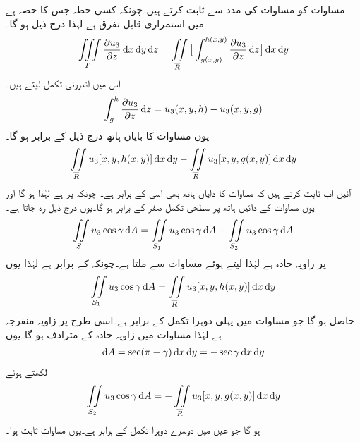 مساوات  کو مساوات  کی مدد سے ثابت کرتے ہیں۔چونکہ کسی خطہ جس کا  حصہ ہے میں  استمراری قابل تفرق ہے لہٰذا درج ذیل ہو گا۔
\begin{align}\label{مساوات_خطی_تکمل_مسئلہ_گاوس_ح}
\iiint\limits_T \frac{\partial u_3}{\partial z} \dif x\dif y\dif z=\iint\limits_{\overline{R}}\big[\int_{g(x,y)}^{h(x,y)} \frac{\partial u_3}{\partial z}\dif z\big]\dif x\dif y
\end{align}
اس میں اندرونی تکمل لیتے ہیں۔
\begin{align*}
\int_g^h \frac{\partial u_3}{\partial z}\dif z=u_3(x,y,h)-u_3(x,y,g)
\end{align*}
یوں مساوات  کا بایاں ہاتھ درج ذیل کے برابر ہو گا۔
\begin{align}\label{مساوات_خطی_تکمل_مسئلہ_گاوس_خ}
\iint\limits_{\overline{R}}u_3[x,y,h(x,y)]\dif x\dif y-\iint\limits_{\overline{R}}u_3[x,y,g(x,y)]\dif x\dif y
\end{align}
آئیں اب ثابت کرتے ہیں کہ  مساوات  کا دایاں ہاتھ بھی اسی کے برابر ہے۔ چونکہ  پر   ہے لہٰذا  ہو گا اور یوں مساوات  کے دائیں ہاتھ   پر سطحی تکمل صفر کے برابر ہو گا۔یوں درج ذیل رہ جاتا ہے۔
\begin{align*}
\iint\limits_S u_3\cos \gamma \dif A=\iint\limits_{S_1}u_3\cos \gamma \dif A+\iint\limits_{S_2}u_3\cos \gamma \dif A
\end{align*}
 پر  زاویہ حادہ ہے لہٰذا  لیتے ہوئے مساوات  سے  ملتا ہے۔چونکہ  کے برابر ہے لہٰذا یوں
\begin{align*}
\iint\limits_{S_1}u_3\cos \gamma \dif A=\iint\limits_{\overline{R}}u_3[x,y,h(x,y)]\dif x\dif y
\end{align*}
حاصل ہو گا جو مساوات  میں پہلی دوہرا  تکمل کے برابر ہے۔اسی طرح  پر  زاویہ منفرجہ ہے لہٰذا  مساوات   میں زاویہ حادہ  کے مترادف ہو گا۔یوں
\begin{align*}
\dif A=\sec(\pi-\gamma)\dif x\dif y=-\sec \gamma \dif x\dif y
\end{align*}
لکھتے ہوئے
\begin{align}
\iint\limits_{S_2}u_3\cos \gamma \dif A=-\iint\limits_{\overline{R}}u_3[x,y,g(x,y)]\dif x\dif y
\end{align}
ہو گا جو عین  میں دوسرے دوہرا تکمل کے برابر ہے۔یوں مساوات  ثابت ہوا۔

